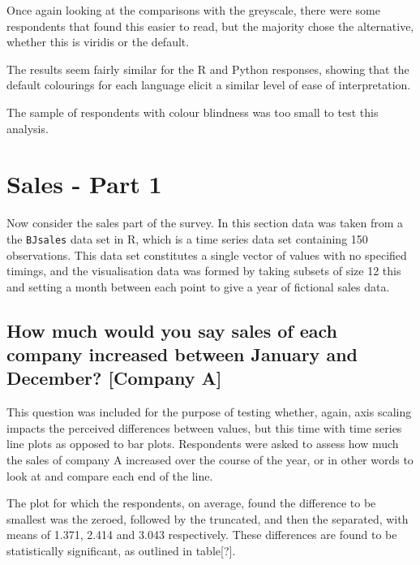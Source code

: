 \documentclass[
]{article}
\begin{document}
Once again looking at the comparisons with the greyscale, there were
some respondents that found this easier to read, but the majority chose
the alternative, whether this is viridis or the default.

The results seem fairly similar for the R and Python responses, showing
that the default colourings for each language elicit a similar level of
ease of interpretation.

The sample of respondents with colour blindness was too small to test
this analysis.

\section{Sales - Part 1}

Now consider the sales part of the survey. In this section data was
taken from a the \texttt{BJsales} data set in R, which is a time series
data set containing 150 observations. This data set constitutes a single
vector of values with no specified timings, and the visualisation data
was formed by taking subsets of size 12 this and setting a month between
each point to give a year of fictional sales data.

\subsection{How much would you say sales of each company increased between January and December? [Company A]}

This question was included for the purpose of testing whether, again,
axis scaling impacts the perceived differences between values, but this
time with time series line plots as opposed to bar plots. Respondents
were asked to assess how much the sales of company A increased over the
course of the year, or in other words to look at and compare each end of
the line.

The plot for which the respondents, on average, found the difference to
be smallest was the zeroed, followed by the truncated, and then the
separated, with means of 1.371, 2.414 and 3.043 respectively. These
differences are found to be statistically significant, as outlined in
table{[}?{]}.
\end{document}
